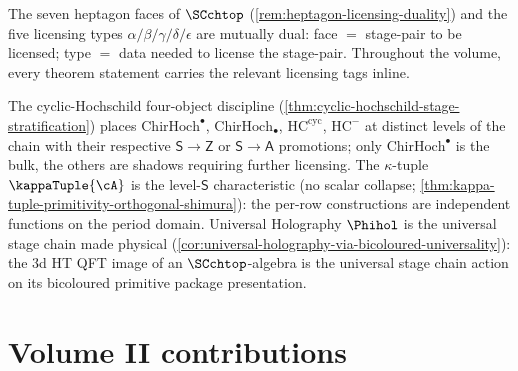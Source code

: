 The seven heptagon faces of $\SCchtop$
\textup(\cref{rem:heptagon-licensing-duality}\textup) and the
five licensing types $\alpha / \beta / \gamma / \delta / \epsilon$
are mutually dual: face $=$ stage-pair to be licensed; type $=$
data needed to license the stage-pair. Throughout the volume,
every theorem statement carries the relevant licensing tags
inline.

The cyclic-Hochschild four-object discipline
\textup(\cref{thm:cyclic-hochschild-stage-stratification}\textup)
places $\mathrm{ChirHoch}^\bullet$, $\mathrm{ChirHoch}_\bullet$,
$\mathrm{HC}^{\mathrm{cyc}}$, $\mathrm{HC}^-$ at distinct levels
of the chain with their respective $\mathsf{S} \to \mathsf{Z}$ or
$\mathsf{S} \to \mathsf{A}$ promotions; only
$\mathrm{ChirHoch}^\bullet$ is the bulk, the others are shadows
requiring further licensing. The $\kappa$-tuple
$\kappaTuple{\cA}$ is the level-$\mathsf{S}$ characteristic
\textup(no scalar collapse;
\cref{thm:kappa-tuple-primitivity-orthogonal-shimura}\textup):
the per-row constructions are independent functions on the
period domain. Universal Holography $\Phihol$ is the universal
stage chain made physical
\textup(\cref{cor:universal-holography-via-bicoloured-universality}\textup):
the $3$d HT QFT image of an $\SCchtop$-algebra is the universal
stage chain action on its bicoloured primitive package presentation.

\section*{Volume II contributions}

